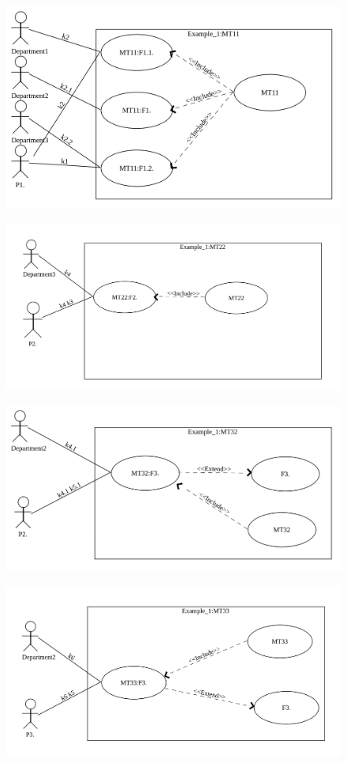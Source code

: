 \documentclass{VUMIFInfBakalaurinis}
\begin{document}
\begin{figure}[H]
    \centering
    \includegraphics[width=12cm]{img/appendix/run_examples/generated_use_case/mt11}
\end{figure}
\begin{figure}[H]
    \centering
    \includegraphics[width=12cm]{img/appendix/run_examples/generated_use_case/mt22}
\end{figure}
\begin{figure}[H]
    \centering
    \includegraphics[width=12cm]{img/appendix/run_examples/generated_use_case/mt32}
\end{figure}
\begin{figure}[H]
    \centering
    \includegraphics[width=12cm]{img/appendix/run_examples/generated_use_case/mt33}
\end{figure}
\end{document}
